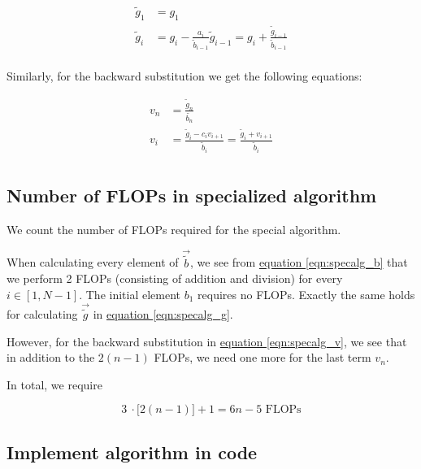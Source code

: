 \documentclass[english,notitlepage]{article}  %
\begin{document}
    \begin{equation}
      \begin{split}
        \tilde{g}_1 &= g_1 \\
        \tilde{g}_i &= g_i - \frac{a_i}{\tilde{b}_{i-1}} \tilde{g}_{i-1} = g_i + \frac{\tilde{g}_{i-1}}{\tilde{b}_{i-1}} \\ \label{eqn:specalg_g}
       \end{split}
    \end{equation}

    Similarly, for the backward substitution we get the following equations:

    \begin{equation}
      \begin{split}
        v_n &= \frac{\tilde{g}_n}{\tilde{b_n}} \\
        v_i &= \frac{\tilde{g}_i - c_i v_{i+1}}{\tilde{b}_i} = \frac{\tilde{g}_i + v_{i+1}}{\tilde{b}_i} \\ \label{eqn:specalg_v}
       \end{split}
    \end{equation}

  \subsection*{Number of FLOPs in specialized algorithm}

    We count the number of FLOPs required for the special algorithm.

    When calculating every element of $\vec{\tilde{b}}$, we see from \hyperref[eqn:specalg_b]{equation \ref*{eqn:specalg_b}}  that we perform 2 FLOPs (consisting of addition and division) for every $i \in [1, N-1]$. The initial element $b_1$ requires no FLOPs. Exactly the same holds for calculating $\vec{\tilde{g}}$ in \hyperref[eqn:specalg_g]{equation \ref*{eqn:specalg_g}}.

    However, for the backward substitution in \hyperref[eqn:specalg_v]{equation \ref*{eqn:specalg_v}}, we see that in addition to the $2(n-1)$ FLOPs, we need one more for the last term $v_n$.

    In total, we require

    \begin{equation}
      3 ~ \cdotp \big[ 2(n-1)\big] + 1 = 6n-5 \text{ FLOPs}
    \end{equation}

    \subsection*{Implement algorithm in code}
\end{document}
